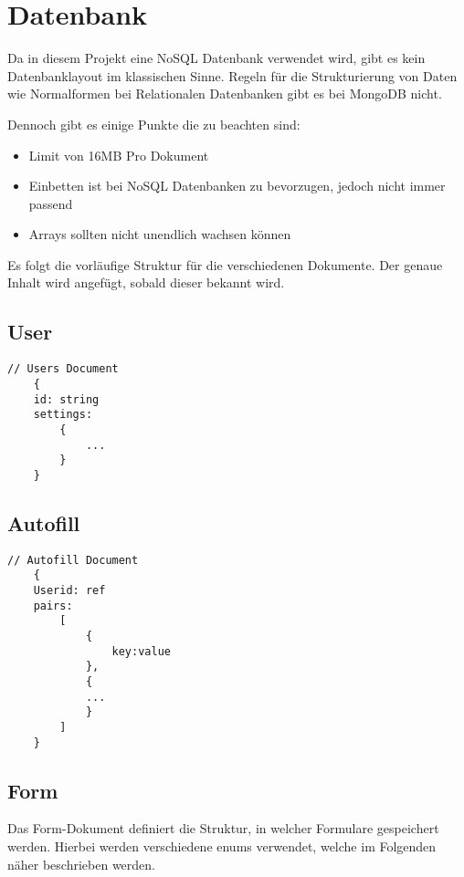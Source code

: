 \chapter{Datenbank}
Da in diesem Projekt eine NoSQL Datenbank verwendet wird, gibt es kein Datenbanklayout im klassischen Sinne.
Regeln für die Strukturierung von Daten wie Normalformen bei Relationalen Datenbanken gibt es bei MongoDB nicht.

Dennoch gibt es einige Punkte die zu beachten sind:
\begin{itemize}
    \item Limit von 16\ac{MB} Pro Dokument
    \item Einbetten ist bei NoSQL Datenbanken zu bevorzugen, jedoch nicht immer passend
    \item Arrays sollten nicht unendlich wachsen können
\end{itemize}

Es folgt die vorläufige Struktur für die verschiedenen Dokumente.
Der genaue Inhalt wird angefügt, sobald dieser bekannt wird.

\section{User}

\begin{lstlisting}[label={lst:lstlistingusers}]
    // Users Document
    {
    id: string
    settings:
        {
            ...
        }
    }

\end{lstlisting}

\section{Autofill}
\begin{lstlisting}[label={lst:lstlistingauto}]
    // Autofill Document
    {
    Userid: ref
    pairs:
        [
            {
                key:value
            },
            {
            ...
            }
        ]
    }

\end{lstlisting}

\section{Form}\label{sec:form}
Das Form-Dokument definiert die Struktur, in welcher Formulare gespeichert werden.
Hierbei werden verschiedene \gls{enum}s verwendet, welche im Folgenden näher beschrieben werden.


